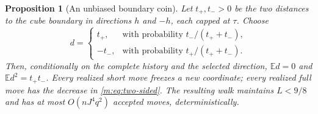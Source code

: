 \documentclass[11pt]{amsart}
\newtheorem{proposition}[theorem]{Proposition}
\theoremstyle{definition}\newtheorem{definition}[theorem]{Definition}
\theoremstyle{remark}\newtheorem{remark}[theorem]{Remark}
\numberwithin{equation}{section}
\begin{document}
\begin{proposition}[An unbiased boundary coin]\label{m:prop:coin}
Let $t_+,t_->0$ be the two distances to the cube boundary in directions
$h$ and $-h$, each capped at $\tau$. Choose
\begin{equation}
 d=\begin{cases}
 t_+,&\text{with probability }t_-/(t_++t_-),\\
 -t_-,&\text{with probability }t_+/(t_++t_-).
 \end{cases}                                               \label{m:eq:coin}
\end{equation}
Then, conditionally on the complete history and the selected direction,
$\mathbb E d=0$ and $\mathbb E d^2=t_+t_-$. Every realized short move
freezes a new coordinate; every realized full move has the decrease in
\eqref{m:eq:two-sided}. The resulting walk maintains $L<9/8$ and has
at most $O(nJ^4q^2)$ accepted moves, deterministically.
\end{proposition}
\end{document}
